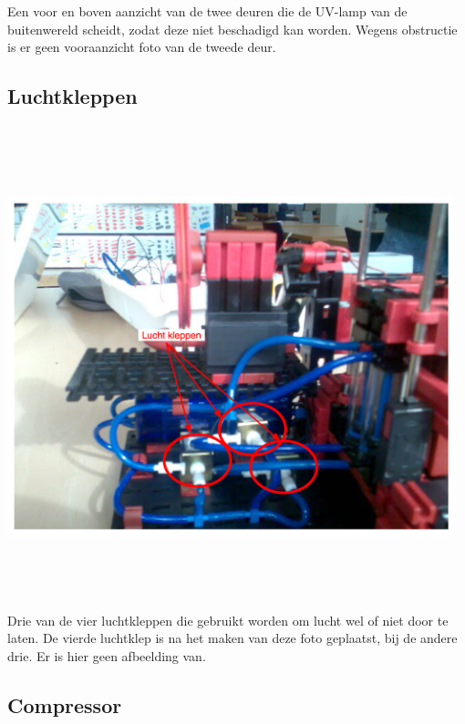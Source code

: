 Een voor en boven aanzicht van de twee deuren die de UV-lamp van de buitenwereld scheidt, zodat deze niet beschadigd kan worden. Wegens obstructie is er geen vooraanzicht foto van de tweede deur.



\subsection{Luchtkleppen}\label{sub:luchtkleppen} %
\includegraphics[width=13cm, height=14cm]{valve} \\
Drie van de vier luchtkleppen die gebruikt worden om lucht wel of niet door te laten. De vierde luchtklep is na het maken van deze foto geplaatst, bij de andere drie. Er is hier geen afbeelding van.


\subsection{Compressor}\label{sub:compressor} %


